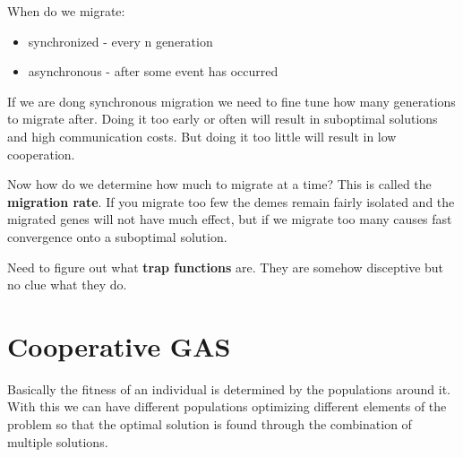 \documentclass[12pt]{article}
\begin{document}
When do we migrate:
\begin{itemize}
  \item synchronized - every n generation
  \item asynchronous - after some event has occurred
\end{itemize}

If we are dong synchronous migration we need to fine tune how many generations to migrate after. Doing it too early or often will result in suboptimal solutions and high communication costs. But doing it too little will result in low cooperation.

Now how do we determine how much to migrate at a time? This is called the \textbf{migration rate}. If you migrate too few the demes remain fairly isolated and the migrated genes will not have much effect, but if we migrate too many causes fast convergence onto a suboptimal solution.

Need to figure out what \textbf{trap functions} are. They are somehow disceptive but no clue what they do.



\section{Cooperative GAS} %
\label{sec:cooperative_gas}
Basically the fitness of an individual is determined by the populations around it. With this we can have different populations optimizing different elements of the problem so that the optimal solution is found through the combination of multiple solutions.



















\end{document}

